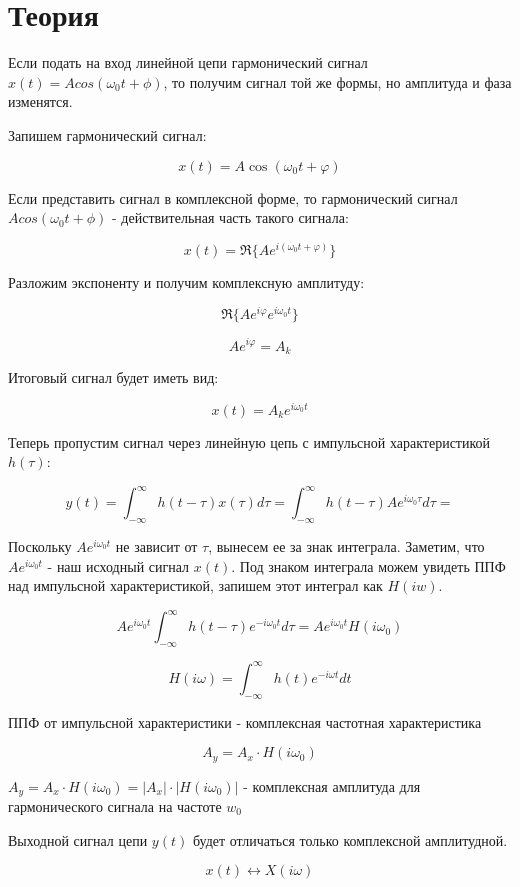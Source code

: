 \chapter{Теория}
\label{ch:intro}

Если подать на вход линейной цепи гармонический сигнал $x(t) = Acos(\omega_0t+\phi)$, то получим сигнал той же формы, но
амплитуда и фаза изменятся.

Запишем гармонический сигнал:

\[
x(t) = A \cos(\omega_0 t + \varphi)
\]

Если представить сигнал в комплексной форме, то гармонический сигнал $Acos(\omega_0t+\phi)$ - действительная часть такого сигнала:

\[
x(t) = \Re \{ A e^{i(\omega_0 t + \varphi)} \}
\]

Разложим экспоненту и получим комплексную амплитуду:

\[
\Re \{ A e^{i\varphi} e^{i\omega_0 t} \}
\]


\[
A e^{i\varphi} = A_k
\]

Итоговый сигнал будет иметь вид:

\[
x(t) = A_k e^{i\omega_0 t}
\]

Теперь пропустим сигнал через линейную цепь с импульсной характеристикой $h(\tau)$:

\[
y(t) = \int_{-\infty}^{\infty} h(t - \tau) x(\tau) d\tau = 
\int_{-\infty}^{\infty} h(t - \tau) A e^{i\omega_0 \tau} d\tau = 
\]

Поскольку $A e^{i\omega_0 t}$ не зависит от $\tau$, вынесем ее за знак интеграла. Заметим, что $A e^{i\omega_0 t}$ - наш исходный
сигнал $x(t)$. Под знаком интеграла можем увидеть ППФ над импульсной характеристикой, запишем этот интеграл как $H(iw)$.

\[
A e^{i\omega_0 t} \int_{-\infty}^{\infty} h(t - \tau) e^{-i\omega_0 t} d\tau =
A e^{i\omega_0 t} H(i\omega_0)
\]

\[
\boxed{H(i\omega) = \int_{-\infty}^{\infty} h(t) e^{-i\omega t} dt}
\]

ППФ от импульсной характеристики - комплексная частотная характеристика

\[
A_y = A_x \cdot H(i\omega_0)
\]

$
A_y = A_x \cdot H(i\omega_0) = |A_x| \cdot |H(i\omega_0)|
$ - комплексная амплитуда для гармонического сигнала на частоте $w_0$

Выходной сигнал цепи $y(t)$ будет отличаться только комплексной амплитудной.

\[
x(t) \leftrightarrow X(i\omega)
\]


